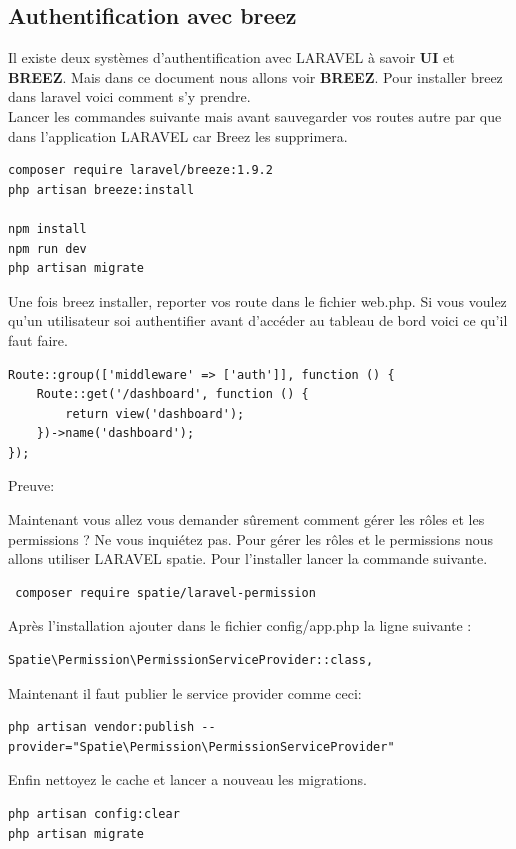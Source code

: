 \documentclass[12pt,a4paper]{article}
\begin{document}
\subsection{Authentification avec breez}
Il existe deux systèmes d'authentification avec LARAVEL à savoir \textbf{UI} et \textbf{BREEZ}. Mais dans ce document nous allons voir \textbf{BREEZ}. Pour installer
breez dans laravel voici comment s'y prendre.\\
Lancer les commandes suivante mais avant sauvegarder vos routes autre par que dans 
l'application LARAVEL car Breez les supprimera.

\begin{verbatim}
composer require laravel/breeze:1.9.2
php artisan breeze:install
 
npm install
npm run dev
php artisan migrate
\end{verbatim}

Une fois breez installer, reporter vos route dans le fichier web.php.
Si vous voulez qu'un utilisateur soi authentifier avant d'accéder au tableau de bord
voici ce qu'il faut faire.
\begin{verbatim}
Route::group(['middleware' => ['auth']], function () {
    Route::get('/dashboard', function () {
        return view('dashboard');
    })->name('dashboard');
});
\end{verbatim}

Preuve:

Maintenant vous allez vous demander sûrement comment gérer les rôles et les permissions ?
Ne vous inquiétez pas. Pour gérer les rôles et le permissions nous allons utiliser
LARAVEL spatie. Pour l'installer lancer la commande suivante.

\begin{verbatim}
 composer require spatie/laravel-permission
\end{verbatim}

Après l'installation ajouter dans le fichier config/app.php la ligne suivante :
\begin{verbatim}
Spatie\Permission\PermissionServiceProvider::class,
\end{verbatim}

Maintenant il faut publier le service provider comme ceci:
\begin{verbatim}
php artisan vendor:publish --provider="Spatie\Permission\PermissionServiceProvider"
\end{verbatim}

Enfin nettoyez le cache et lancer a nouveau les migrations.
\begin{verbatim}
php artisan config:clear
php artisan migrate
\end{verbatim}
\end{document}
